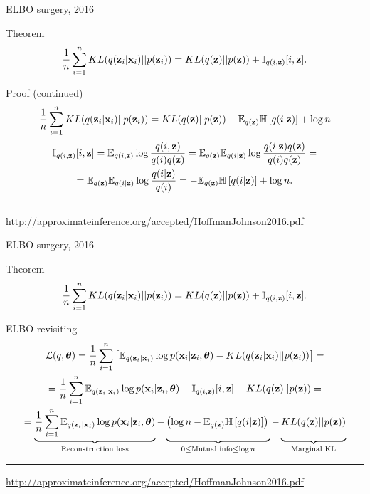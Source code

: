 \begin{frame}{ELBO surgery, 2016}
\begin{block}{Theorem}
\[
    \frac{1}{n} \sum_{i=1}^n KL(q(\mathbf{z}_i | \mathbf{x}_i) || p(\mathbf{z}_i)) = KL(q(\mathbf{z}) || p(\mathbf{z})) + \mathbb{I}_{q(i, \mathbf{z})} [i, \mathbf{z}].
\]
\end{block}
\begin{block}{Proof (continued)}
{\footnotesize
\[
    \frac{1}{n} \sum_{i=1}^n KL(q(\mathbf{z}_i | \mathbf{x}_i) || p(\mathbf{z}_i)) = KL (q(\mathbf{z}) || p(\mathbf{z})) - \mathbb{E}_{q(\mathbf{z})} \mathbb{H} \left[q(i | \mathbf{z}) \right] + \log n
\]
\begin{multline*}
    \mathbb{I}_{q(i, \mathbf{z})} [i, \mathbf{z}] = \mathbb{E}_{q(i, \mathbf{z})} \log \frac{q(i, \mathbf{z})}{q(i)q(\mathbf{z})} = \mathbb{E}_{q(\mathbf{z})} \mathbb{E}_{q(i | \mathbf{z})} \log \frac{q(i | \mathbf{z}) q(\mathbf{z})}{q(i)q(\mathbf{z})} = \\
    = \mathbb{E}_{q(\mathbf{z})} \mathbb{E}_{q(i | \mathbf{z})} \log \frac{q(i | \mathbf{z})}{q(i)} = - \mathbb{E}_{q(\mathbf{z})} \mathbb{H} \left[ q(i | \mathbf{z}) \right] + \log n.
\end{multline*}
}
\end{block}
\vfill
\hrule\medskip
{\scriptsize \href{http://approximateinference.org/accepted/HoffmanJohnson2016.pdf}{http://approximateinference.org/accepted/HoffmanJohnson2016.pdf}}
\end{frame}
\begin{frame}{ELBO surgery, 2016}
\begin{block}{Theorem}
\[
    \frac{1}{n} \sum_{i=1}^n KL(q(\mathbf{z}_i | \mathbf{x}_i) || p(\mathbf{z}_i)) = KL(q(\mathbf{z}) || p(\mathbf{z})) + \mathbb{I}_{q(i, \mathbf{z})} [i, \mathbf{z}].
\]
\end{block}
\begin{block}{ELBO revisiting}
{\footnotesize
\begin{multline*}
    \mathcal{L}(q, \btheta) = \frac{1}{n} \sum_{i=1}^n \left[ \mathbb{E}_{q(\bz_i | \bx_i)} \log p(\bx_i | \bz_i, \btheta) - KL(q(\bz_i | \bx_i) || p(\bz_i)) \right] = \\
    = \frac{1}{n} \sum_{i=1}^n \mathbb{E}_{q(\bz_i | \bx_i)} \log p(\bx_i | \bz_i, \btheta) - \mathbb{I}_{q(i, \bz)} [i, \bz] - KL(q(\bz) || p(\bz)) = \\
    = \underbrace{\frac{1}{n} \sum_{i=1}^n \mathbb{E}_{q(\bz_i | \bx_i)} \log p(\bx_i | \bz_i, \btheta)}_{\text{Reconstruction loss}} - \underbrace{\left(\log n - \mathbb{E}_{q(\bz)} \mathbb{H} \left[ q(i | \bz) \right] \right)\vphantom{\sum_{i=1}} }_{0 \leq \text{Mutual info} \leq \log n } - \underbrace{KL(q(\bz) || p(\bz))\vphantom{\sum_{i=1}}}_{\text{Marginal KL}}
\end{multline*}
}
\end{block}
\vfill
\hrule\medskip
{\scriptsize \href{http://approximateinference.org/accepted/HoffmanJohnson2016.pdf}{http://approximateinference.org/accepted/HoffmanJohnson2016.pdf}}
\end{frame}
